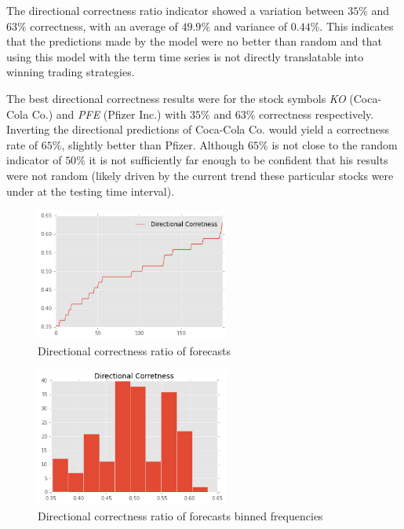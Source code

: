 \documentclass[conference,11pt]{IEEEtran}
\begin{document}
\par
The directional correctness ratio indicator showed a variation between \(35\%\) and \(63\%\) correctness, with an average of \(49.9\%\) and variance of \(0.44\%\). This indicates that the predictions made by the model were no better than random and that using this model with the term time series is not directly translatable into winning trading strategies.

\par
The best directional correctness results were for the stock symbols \textit{KO} (Coca-Cola Co.) and \textit{PFE} (Pfizer Inc.)  with \(35\%\) and \(63\%\) correctness respectively. Inverting the directional predictions of Coca-Cola Co. would yield a correctness rate of \(65\%\), slightly better than Pfizer. Although \(65\%\) is not close to the random indicator of \(50\%\) it is not sufficiently far enough to be confident that his results were not random (likely driven by the current trend these particular stocks were under at the testing time interval).
 
\begin{figure}[!htbp]
\centering
\includegraphics[width=2.5in]{dir_corr_line}
\caption{Directional correctness ratio of forecasts}
\label{fig:dir_corr_line}
\end{figure}

\begin{figure}[!htbp]
\centering
\includegraphics[width=2.5in]{dir_corr_hist}
\caption{Directional correctness ratio of forecasts binned frequencies}
\label{fig:dir_corr_hist}
\end{figure}
\end{document}
